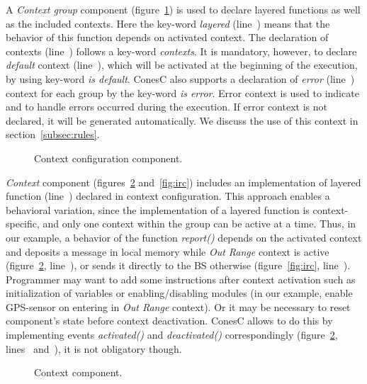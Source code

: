 A \emph{Context group} component (figure~\ref{fig:ccc}) is used to declare layered
functions as well as the included contexts. Here the key-word \emph{layered}
(line~) means that the behavior of this function depends on
activated context. The declaration of contexts (line~) follows a key-word
\emph{contexts}. It is mandatory, however, to declare \emph{default} context
(line~), which will be activated at the beginning of the execution,
by using key-word \emph{is default}. ConesC also supports a declaration of \emph{error}
(line~) context for each group by the key-word \emph{is error}.
Error context is used to indicate and to handle errors occurred during the execution. If
error context is not declared, it will be generated automatically. We discuss the use of
this context in section~\ref{subsec:rules}.


\begin{figure}[!h]
\TheSbox
\caption{Context configuration
component.}
\label{fig:ccc}
\end{figure}

\emph{Context} component (figures~\ref{fig:cc} and~\ref{fig:irc}) includes an
implementation of layered function (line~) declared in context configuration. 
This approach enables a behavioral variation, since the implementation of a layered function is
context-specific, and only one context within the group can be active at a time. Thus, in our
example, a behavior of the function \emph{report()} depends on the activated context and
deposits a message in local memory while \emph{Out Range} context
is active (figure~\ref{fig:cc}, line~),
or sends it directly to the BS otherwise (figure~\ref{fig:irc}, line~).
Programmer may want to add some instructions after
context activation such as initialization of variables or enabling/disabling
modules (in our example, enable GPS-sensor on entering in \emph{Out Range}
context). Or it may be necessary to reset component's state before context
deactivation. ConesC allows to do this by implementing events \emph{activated()} and
\emph{deactivated()} correspondingly (figure~\ref{fig:cc}, lines~
and~), it is not obligatory though.


\begin{figure}[!h]
\TheSbox
\caption{Context component.}
\label{fig:cc}
\end{figure}


